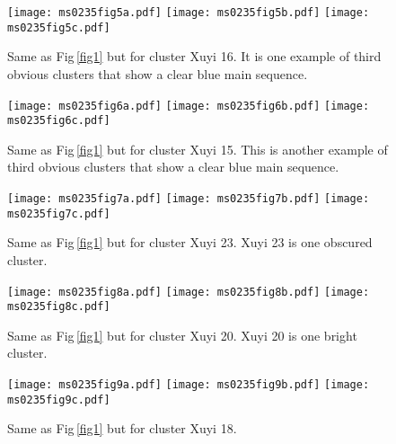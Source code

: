 \documentclass[]{raa_rb}
\begin{document}
  \begin{figure*}
 \begin{center}
 \texttt{[image: ms0235fig5a.pdf]} 
 \texttt{[image: ms0235fig5b.pdf]}
 \texttt{[image: ms0235fig5c.pdf]}
 \caption{Same as Fig\,\ref{fig1} but for cluster Xuyi 16. It is one example of
 third obvious clusters that show a clear blue main sequence.} 
 \label{fig3}
 \end{center}
 \end{figure*}
 
 
 \begin{figure*}
 \begin{center}
  \texttt{[image: ms0235fig6a.pdf]}
 \texttt{[image: ms0235fig6b.pdf]}
  \texttt{[image: ms0235fig6c.pdf]}

 \caption{Same as Fig\,\ref{fig1} but for cluster Xuyi 15. This is another example of
 third obvious clusters that show a clear blue main sequence.} 
 \label{fig4}
 \end{center}
 \end{figure*}
 
 
 \begin{figure*}
 \begin{center}
 \texttt{[image: ms0235fig7a.pdf]}
 \texttt{[image: ms0235fig7b.pdf]}
 \texttt{[image: ms0235fig7c.pdf]}
 \caption{Same as Fig\,\ref{fig1} but for cluster Xuyi 23. Xuyi 23 is one obscured cluster.}
 \label{fig5}
 \end{center}
 \end{figure*}
 
  \begin{figure*}
 \begin{center}
 \texttt{[image: ms0235fig8a.pdf]}
   \texttt{[image: ms0235fig8b.pdf]}
   \texttt{[image: ms0235fig8c.pdf]}
  \caption{Same as Fig\,\ref{fig1} but for cluster Xuyi 20. Xuyi 20 is one bright cluster.}
 \label{fig6}
 \end{center}
 \end{figure*}
 
 
  
  \begin{figure*}
 \begin{center}
  \texttt{[image: ms0235fig9a.pdf]}
  \texttt{[image: ms0235fig9b.pdf]}
   \texttt{[image: ms0235fig9c.pdf]} 
  \caption{Same as Fig\,\ref{fig1} but for cluster Xuyi 18.}
 \label{fig8}
 \end{center}
 \end{figure*}
 
\end{document}
